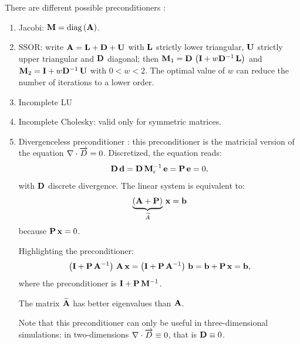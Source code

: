 There are different possible preconditioners \cite{barrett_templates}:
\begin{enumerate}
\item Jacobi: $\mathbf{M} = \operatorname{diag}\left(\mathbf{A}\right)$.
\item SSOR: write $\mathbf{A} = \mathbf{L} + \mathbf{D} + \mathbf{U}$
  with $\mathbf{L}$ strictly lower triangular, $\mathbf{U}$ strictly
  upper triangular and $\mathbf{D}$ diagonal; then $\mathbf{M}_1 =
  {\mathbf{D}\,\left(\mathbf{I} + w
  {\mathbf{D}^{-1}\,\mathbf{L}}\right)}$ and $\mathbf{M}_2 = \mathbf{I} +  
  w {\mathbf{D}^{-1}\,\mathbf{U}}$ with $0 < w < 2$. The optimal
  value of $w$ can reduce the number of iterations to a lower order.
\item Incomplete LU
\item Incomplete Cholesky: valid only for symmetric matrices.
\item Divergenceless preconditioner \cite{hebermehl_improved}: this
  preconditioner is the matricial version of the equation
  ${\nabla \cdot \overrightarrow{D}} = 0$. Discretized, the equation reads:
  \begin{equation*}
    {\mathbf{D}\,\mathbf{d}} =
    {{\mathbf{D}\,\mathbf{M}_\epsilon^{-1}}\,\mathbf{e}} =
    {\mathbf{P}\,\mathbf{e}} = 0,
  \end{equation*}
  with $\mathbf{D}$ discrete divergence. The linear system is
  equivalent to:
  \begin{equation}
    {\underbrace{(\mathbf{A} + \mathbf{P})}_{\widetilde{A}}\,\mathbf{x}} = \mathbf{b}
  \end{equation}
  because ${\mathbf{P}\,\mathbf{x}} = 0$.
  
  Highlighting the preconditioner:
    \begin{equation}
      {{\left(\mathbf{I} +
      {\mathbf{P}\,\mathbf{A}^{-1}}\right)\,\mathbf{A}}\,\mathbf{x}}
      = {\left(\mathbf{I} +
      {\mathbf{P}\,\mathbf{A}^{-1}}\right)\,\mathbf{b}} =
      \mathbf{b} + {\mathbf{P}\,\mathbf{x}} = \mathbf{b} ,
    \end{equation}
    where the preconditioner is $\mathbf{I} +
    {\mathbf{P}\,\mathbf{M}^{-1}}$.
    
    The matrix $\widetilde{\mathbf{A}}$ has better eigenvalues than $\mathbf{A}$.

    Note that this preconditioner can only be useful in three-dimensional
    simulations: in two-dimensions ${\nabla \cdot \overrightarrow{D}} \equiv 0$, that is
    $\mathbf{D} \equiv 0$.    
  \end{enumerate}

